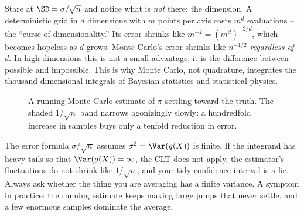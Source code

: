 \begin{aestheticbox}
Stare at $\SD = \sigma/\sqrt n$ and notice what is \emph{not} there: the
dimension. A deterministic grid in $d$ dimensions with $m$ points per axis costs
$m^d$ evaluations -- the ``curse of dimensionality.'' Its error shrinks like
$m^{-2} = (m^d)^{-2/d}$, which becomes hopeless as $d$ grows. Monte Carlo's error
shrinks like $n^{-1/2}$ \emph{regardless of $d$}. In high dimensions this is not a
small advantage; it is the difference between possible and impossible. This is
why Monte Carlo, not quadrature, integrates the thousand-dimensional integrals of
Bayesian statistics and statistical physics.
\end{aestheticbox}

\begin{figure}[H]
\centering
{}
\caption{A running Monte Carlo estimate of $\pi$ settling toward the truth. The
shaded $1/\sqrt n$ band narrows agonizingly slowly: a hundredfold increase in
samples buys only a tenfold reduction in error.}
\label{ch35:fig-convergence}
\end{figure}

\begin{trapbox}
The error formula $\sigma/\sqrt n$ assumes $\sigma^2 = \Var(g(X))$ is finite. If
the integrand has heavy tails so that $\Var(g(X)) = \infty$, the CLT does not
apply, the estimator's fluctuations do not shrink like $1/\sqrt n$, and your tidy
confidence interval is a lie. Always ask whether the thing you are averaging has
a finite variance. A symptom in practice: the running estimate keeps making large
jumps that never settle, and a few enormous samples dominate the average.
\end{trapbox}

